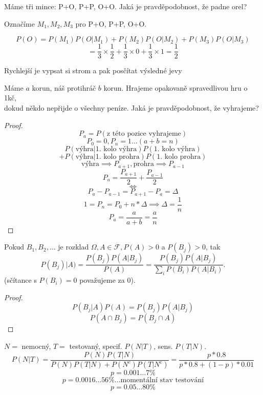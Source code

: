 \documentclass[../main.tex]{subfiles}
\begin{document}
\begin{example}
    Máme tři mince: P+O, P+P, O+O. Jaká je pravděpodobnost, že padne orel?

    \noindent
    Označíme $M_1, M_2, M_3$ pro P+O, P+P, O+O.
    
    \[P(O) = P(M_1)P(O|M_1) + P(M_2)P(O|M_2) + P(M_3)P(O|M_3)\]
    \[ = \frac{1}{3}\times \frac{1}{2} + \frac{1}{3}\times 0 + \frac{1}{3}\times 1 = \frac{1}{2}\]

    \noindent
    Rychlejší je vypsat si strom a pak posčítat výsledné jevy
\end{example}

\begin{example}
    Máme $a$ korun, náš protihráč $b$ korun. Hrajeme opakovaně spravedlivou hru o 1kč,\\
    dokud někdo nepřijde o všechny peníze. Jaká je pravděpodobnost, že vyhrajeme?
\end{example}
\begin{proof}
    \[P_a = P(\text{z této pozice vyhrajeme})\]
    \[P_0 = 0, P_n = 1 \dots (a+b = n)\]
    \[P(\text{výhra}|\text{1. kolo výhra})P(\text{1. kolo výhra})\]
    \[+ P(\text{výhra}|\text{1. kolo prohra})P(\text{1. kolo prohra})\]
    \[\text{výhra}\implies P_{a+1}, \text{prohra}\implies P_{a-1}\]
    \[P_a = \frac{P_{a+1}}{2} + \frac{P_{a-1}}{2}\]
    \[ \Leftrightarrow \]
    \[P_a - P_{a-1} = P_{a+1} - P_a = \Delta\]
    \[1 = P_n = P_0 + n*\Delta \implies \Delta = \frac{1}{n}\]
    \[P_a = \frac{a}{a+b} = \frac{a}{n}\]
\end{proof}

\begin{theorem}
    Pokud $B_1,B_2,\dots $ je rozklad $\Omega, A \in \mathcal{F}, P(A) > 0$ a $P(B_j) > 0$, tak
    \[P(B_j)| A) = \frac{P(B_j)P(A|B_j)}{P(A)} = \frac{P(B_j)P(A|B_j)}{\sum_i P(B_i)P(A|B_i)}.\]
    (sčítance s $P(B_i) = 0$ považujeme za $0$).
\end{theorem}
\begin{proof}
    \[P(B_j | A)P(A) = P(B_j)P(A|B_j)\]
    \[P(A\cap B_j) = P(B_j \cap A)\]
\end{proof}


\begin{example}
    $N=$ nemocný, $T=$ testovaný, specif. $P(N|T)$, sens. $P(T|N)$.
    \[P(N|T) = \frac{P(N)P(T|N)}{P(N)P(T|N)+ P(N^c)P(T|N^c)} = \frac{p*0.8}{p*0.8 + (1-p)*0.01}\]
    \[p = 0.001 \dots 7\%\]
    \[p = 0.0016 \dots 56\% \dots \text{momentální stav testování}\]
    \[p = 0.05 \dots 80\%\] 
\end{example}
\end{document}
